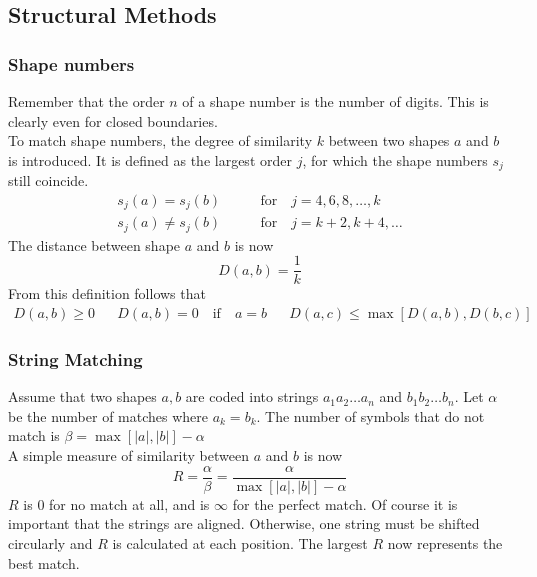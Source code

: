 \subsection{Structural Methods}

\subsubsection{Shape numbers}
Remember that the order $n$ of a shape number is the number of digits. This is clearly even for closed boundaries. \\

To match shape numbers, the degree of similarity $k$ between two shapes $a$ and $b$ is introduced. 
It is defined as the largest order $j$, for which the shape numbers $s_j$ still coincide.
\begin{align*}
	s_j(a) = s_j(b) \qquad & \text{for} \quad j=4,6,8,\ldots,k \\
	s_j(a) \neq s_j(b) \qquad & \text{for} \quad j=k+2,k+4,\ldots
\end{align*}
The distance between shape $a$ and $b$ is now
	\[
		D(a,b) = \frac{1}{k}
	\]
From this definition follows that
\begin{align*}
	D(a,b) \geq 0 && D(a,b) = 0 \quad \text{if} \quad a=b && D(a,c) \leq \max[D(a,b),D(b,c)]
\end{align*}

\subsubsection{String Matching}
Assume that two shapes $a,b$ are coded into strings $a_1a_2\ldots a_n$ and $b_1b_2\ldots b_n$. 
Let $\alpha$ be the number of matches where $a_k = b_k$. 
The number of symbols that do not match is $\beta = \max[|a|,|b|] - \alpha$ \\

A simple measure of similarity between $a$ and $b$ is now
	\[
		R = \frac{\alpha}{\beta} = \frac{\alpha}{\max[|a|,|b|] - \alpha}
	\]
$R$ is $0$ for no match at all, and is $\infty$ for the perfect match. 
Of course it is important that the strings are aligned. 
Otherwise, one string must be shifted circularly and $R$ is calculated at each position.
The largest $R$ now represents the best match.